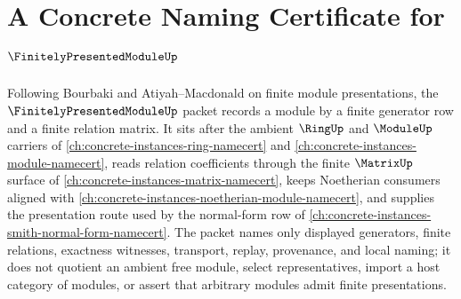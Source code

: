\chapter{A Concrete Naming Certificate for $\FinitelyPresentedModuleUp$}
\label{ch:concrete-instances-finitely-presented-module-namecert}

Following Bourbaki and Atiyah--Macdonald on finite module presentations, the $\FinitelyPresentedModuleUp$ packet records a module by a finite generator row and a finite relation matrix. It sits after the ambient $\RingUp$ and $\ModuleUp$ carriers of \autoref{ch:concrete-instances-ring-namecert} and \autoref{ch:concrete-instances-module-namecert}, reads relation coefficients through the finite $\MatrixUp$ surface of \autoref{ch:concrete-instances-matrix-namecert}, keeps Noetherian consumers aligned with \autoref{ch:concrete-instances-noetherian-module-namecert}, and supplies the presentation route used by the normal-form row of \autoref{ch:concrete-instances-smith-normal-form-namecert}. The packet names only displayed generators, finite relations, exactness witnesses, transport, replay, provenance, and local naming; it does not quotient an ambient free module, select representatives, import a host category of modules, or assert that arbitrary modules admit finite presentations.

